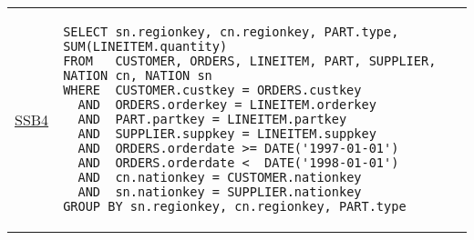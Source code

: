 \hspace{-5mm}\vspace{-8mm}
\begin{tabular}{lp{}}
\begin{rotate}{90}\hspace{-1.1cm}\underline{SSB4}\end{rotate} &
{\scriptsize
\begin{verbatim}
SELECT sn.regionkey, cn.regionkey, PART.type, SUM(LINEITEM.quantity)
FROM   CUSTOMER, ORDERS, LINEITEM, PART, SUPPLIER, NATION cn, NATION sn
WHERE  CUSTOMER.custkey = ORDERS.custkey
  AND  ORDERS.orderkey = LINEITEM.orderkey
  AND  PART.partkey = LINEITEM.partkey
  AND  SUPPLIER.suppkey = LINEITEM.suppkey
  AND  ORDERS.orderdate >= DATE('1997-01-01')
  AND  ORDERS.orderdate <  DATE('1998-01-01')
  AND  cn.nationkey = CUSTOMER.nationkey
  AND  sn.nationkey = SUPPLIER.nationkey
GROUP BY sn.regionkey, cn.regionkey, PART.type
\end{verbatim}}
\end{tabular}
